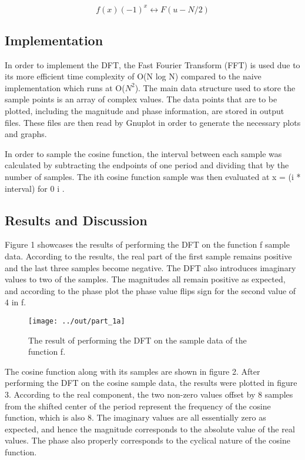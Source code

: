 \documentclass[headings=optiontoheadandtoc,listof=totoc,parskip=full]{scrartcl}
\begin{document}
        \[
        	f(x)(-1)^x \leftrightarrow F(u-N/2)
        \]


\subsection{Implementation}

In order to implement the DFT, the Fast Fourier Transform (FFT) is used due to its more efficient time complexity of O(N log N) compared to the naive implementation which runs at O(\(N^2\)). The main data structure used to store the sample points is an array of complex values. The data points that are to be plotted, including the magnitude and phase information, are stored in output files. These files are then read by Gnuplot in order to generate the necessary plots and graphs.

In order to sample the cosine function, the interval between each sample was calculated by subtracting the endpoints of one period and dividing that by the number of samples. The ith cosine function sample was then evaluated at x = (i * interval) for 0 \leq i .

\subsection{Results and Discussion}

Figure 1 showcases the results of performing the DFT on the function f sample data. According to the results, the real part of the first sample remains positive and the last three samples become negative. The DFT also introduces imaginary values to two of the samples. The magnitudes all remain positive as expected, and according to the phase plot the phase value flips sign for the second value of 4 in f.

\begin{figure}[ht]
	\centering
	\texttt{[image: ../out/part\_1a]}
	\caption{The result of performing the DFT on the sample data of the function f.}
	\label{fig:part_1a}
\end{figure}

The cosine function along with its samples are shown in figure 2. After performing the DFT on the cosine sample data, the results were plotted in figure 3. According to the real component, the two non-zero values offset by 8 samples from the shifted center of the period represent the frequency of the cosine function, which is also 8. The imaginary values are all essentially zero as expected, and hence the magnitude corresponds to the absolute value of the real values. The phase also properly corresponds to the cyclical nature of the cosine function.
\end{document}
